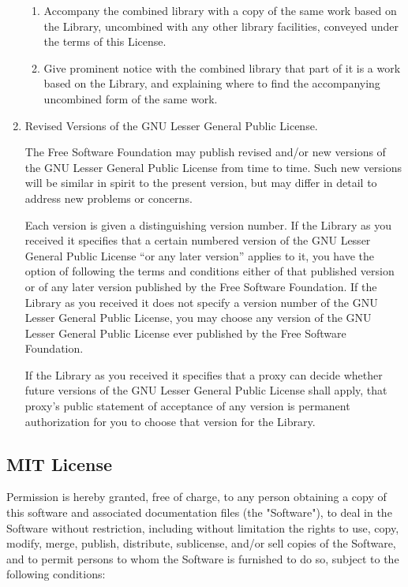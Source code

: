 \documentclass[10pt]{article}
\begin{document}
\begin{enumerate}
   \begin{enumerate}
   \item Accompany the combined library with a copy of the same work based
   on the Library, uncombined with any other library facilities,
   conveyed under the terms of this License.

   \item Give prominent notice with the combined library that part of it
   is a work based on the Library, and explaining where to find the
   accompanying uncombined form of the same work.
   \end{enumerate}

\item Revised Versions of the GNU Lesser General Public License.

  The Free Software Foundation may publish revised and/or new versions
of the GNU Lesser General Public License from time to time. Such new
versions will be similar in spirit to the present version, but may
differ in detail to address new problems or concerns.

  Each version is given a distinguishing version number. If the
Library as you received it specifies that a certain numbered version
of the GNU Lesser General Public License ``or any later version''
applies to it, you have the option of following the terms and
conditions either of that published version or of any later version
published by the Free Software Foundation. If the Library as you
received it does not specify a version number of the GNU Lesser
General Public License, you may choose any version of the GNU Lesser
General Public License ever published by the Free Software Foundation.

  If the Library as you received it specifies that a proxy can decide
whether future versions of the GNU Lesser General Public License shall
apply, that proxy's public statement of acceptance of any version is
permanent authorization for you to choose that version for the
Library.

\end{enumerate}

\clearpage
\subsection{MIT License}
Permission is hereby granted, free of charge, to any person obtaining a copy
of this software and associated documentation files (the "Software"), to deal
in the Software without restriction, including without limitation the rights
to use, copy, modify, merge, publish, distribute, sublicense, and/or sell
copies of the Software, and to permit persons to whom the Software is
furnished to do so, subject to the following conditions:
\end{document}
